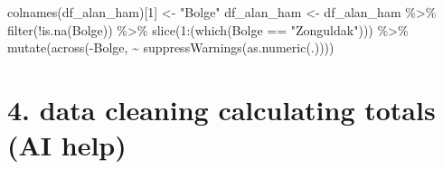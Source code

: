 \documentclass[
  11pt,
  a4paper,
  DIV=11,
  numbers=noendperiod]{scrartcl}
\newenvironment{Shaded}{\begin{snugshade}}{\end{snugshade}}
\newcommand{\DecValTok}[1]{\textcolor[rgb]{0.68,0.00,0.00}{#1}}
\newcommand{\FunctionTok}[1]{\textcolor[rgb]{0.28,0.35,0.67}{#1}}
\newcommand{\NormalTok}[1]{\textcolor[rgb]{0.00,0.23,0.31}{#1}}
\newcommand{\OtherTok}[1]{\textcolor[rgb]{0.00,0.23,0.31}{#1}}
\newcommand{\SpecialCharTok}[1]{\textcolor[rgb]{0.37,0.37,0.37}{#1}}
\newcommand{\StringTok}[1]{\textcolor[rgb]{0.13,0.47,0.30}{#1}}
\begin{document}
\begin{Shaded}
\begin{Highlighting}[]
\FunctionTok{colnames}\NormalTok{(df\_alan\_ham)[}\DecValTok{1}\NormalTok{] }\OtherTok{\textless{}{-}} \StringTok{"Bolge"}
\NormalTok{df\_alan\_ham }\OtherTok{\textless{}{-}}\NormalTok{ df\_alan\_ham }\SpecialCharTok{\%\textgreater{}\%} 
  \FunctionTok{filter}\NormalTok{(}\SpecialCharTok{!}\FunctionTok{is.na}\NormalTok{(Bolge)) }\SpecialCharTok{\%\textgreater{}\%} 
  \FunctionTok{slice}\NormalTok{(}\DecValTok{1}\SpecialCharTok{:}\NormalTok{(}\FunctionTok{which}\NormalTok{(Bolge }\SpecialCharTok{==} \StringTok{"Zonguldak"}\NormalTok{))) }\SpecialCharTok{\%\textgreater{}\%}
  \FunctionTok{mutate}\NormalTok{(}\FunctionTok{across}\NormalTok{(}\SpecialCharTok{{-}}\NormalTok{Bolge, }\SpecialCharTok{\textasciitilde{}} \FunctionTok{suppressWarnings}\NormalTok{(}\FunctionTok{as.numeric}\NormalTok{(.))))}
\end{Highlighting}
\end{Shaded}

\section{4. data cleaning calculating totals (AI
help)}\label{data-cleaning-calculating-totals-ai-help}
\end{document}
